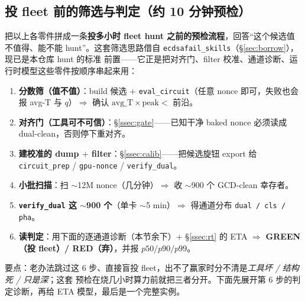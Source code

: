 \documentclass[11pt]{ctexart}
\let\c\lstinline
\begin{document}
\subsection{投 fleet 前的筛选与判定（约 10 分钟预检）}
\label{ssec:screen}
把以上各零件拼成一条\textbf{投多小时 fleet hunt 之前的预检流程}，回答``这个候选值不值得、能不能
hunt''。这套筛选思路借自 \texttt{ecdsafail\_skills}（§\ref{sec:borrow}），现已是本仓库 hunt 的标准
前置——它正是把对齐门、filter 校准、通道诊断、运行时模型这些零件按顺序串起来用：
\begin{enumerate}[nosep]
  \item \textbf{分数筛（值不值）}：build 候选 $+$ \c{eval_circuit}（任意 nonce 即可，失败也会报
  avg-T 与 $q$）$\Rightarrow$ 确认 $\text{avg\_T}\times\text{peak}<$ 前沿。
  \item \textbf{对齐门（工具可不可信）}：§\ref{ssec:gate}——已知干净 baked nonce 必须读成
  dual-clean，否则停下重对齐。
  \item \textbf{建校准的 dump $+$ filter}：§\ref{ssec:calib}——把候选旋钮 export 给
  \c{circuit_prep} / \c{gpu-nonce} / \c{verify_dual}。
  \item \textbf{小批扫描}：扫 $\sim$12M nonce（几分钟）$\Rightarrow$ 收 $\sim$900 个 GCD-clean 幸存者。
  \item \textbf{\c{verify_dual} 这 $\sim$900 个}（单卡 $\sim$5 min）$\Rightarrow$ 得通道分布
  \texttt{dual / cls / pha}。
  \item \textbf{读判定}：用下面的逐通道诊断（本节余下）$+$ §\ref{ssec:rt} 的 ETA $\Rightarrow$
  \textbf{GREEN（投 fleet）/ RED（弃）}，并报 $p50/p90/p99$。
\end{enumerate}
要点：老办法跳过这 6 步、直接盲投 fleet，出不了赢家时分不清是\emph{工具坏 / 结构死 / 只是深}；这套
预检在烧几小时算力前就把三者分开。下面先展开第 6 步的判定诊断，再给 ETA 模型，最后是一个完整实例。
\end{document}
